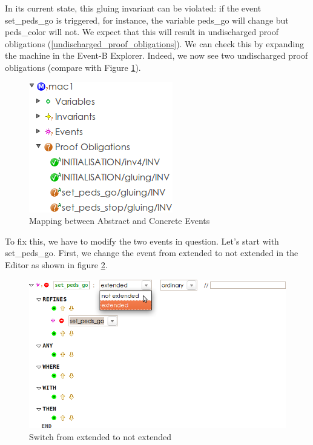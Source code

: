 
In its current state, this gluing invariant can be violated: if the event \textsf{set\_peds\_go} is triggered, for instance, the variable \textsf{peds\_go} will change but \textsf{peds\_color} will not.  We expect that this will result in undischarged proof obligations (\ref{undischarged_proof_obligations}).  We can check this by expanding the machine in the Event-B Explorer.  Indeed, we now see two undischarged proof obligations (compare with Figure \ref{fig_tut_07_undischarged}).

\begin{figure}[!h]
\begin{center}
	\includegraphics{img/tutorial/undischarged1.png}
	\caption{Mapping between Abstract and Concrete Events}
	\label{fig_tut_07_undischarged}
\end{center}
\end{figure}

To fix this, we have to modify the two events in question.  Let's start with \textsf{set\_peds\_go}.  First, we change the event from extended to not extended in the Editor as shown in figure \ref{fig_tut_07_event_refinement}.

\begin{figure}[!h]
\begin{center}
	\includegraphics{img/tutorial/event-refinement.png}
	\caption{Switch from extended to not extended}
	\label{fig_tut_07_event_refinement}
\end{center}
\end{figure}

